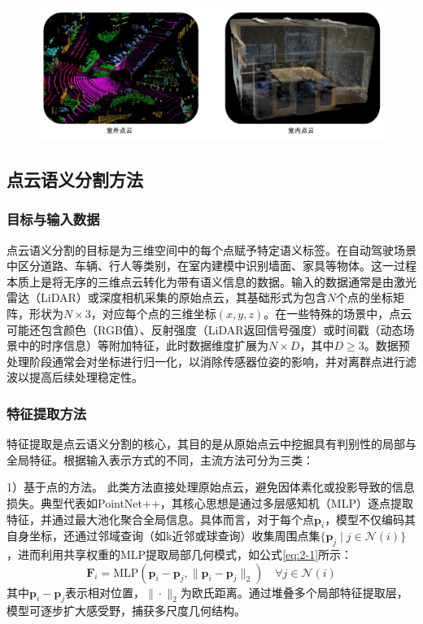 \vspace{-0.1cm}
\begin{figure}[h]
    \centering
    \includegraphics[width = \textwidth, scale=0.5]{ljx/figure/2-1PC.pdf}
    \label{fig:2-1}
\end{figure}
\vspace{-0.35cm}
\subsection{点云语义分割方法}
\subsubsection{目标与输入数据}
点云语义分割的目标是为三维空间中的每个点赋予特定语义标签。在自动驾驶场景中区分道路、车辆、行人等类别，在室内建模中识别墙面、家具等物体。这一过程本质上是将无序的三维点云转化为带有语义信息的数据。输入的数据通常是由激光雷达（LiDAR）或深度相机采集的原始点云，其基础形式为包含$N$个点的坐标矩阵，形状为$N \times 3$，对应每个点的三维坐标$(x, y, z)$。在一些特殊的场景中，点云可能还包含颜色（RGB值）、反射强度（LiDAR返回信号强度）或时间戳（动态场景中的时序信息）等附加特征，此时数据维度扩展为$N \times D$，其中$D \geq 3$。数据预处理阶段通常会对坐标进行归一化，以消除传感器位姿的影响，并对离群点进行滤波以提高后续处理稳定性。

\subsubsection{特征提取方法}
特征提取是点云语义分割的核心，其目的是从原始点云中挖掘具有判别性的局部与全局特征。根据输入表示方式的不同，主流方法可分为三类：

1）基于点的方法。
此类方法直接处理原始点云，避免因体素化或投影导致的信息损失。典型代表如PointNet++，其核心思想是通过多层感知机（MLP）逐点提取特征，并通过最大池化聚合全局信息。具体而言，对于每个点$\mathbf{p}_i$，模型不仅编码其自身坐标，还通过邻域查询（如k近邻或球查询）收集周围点集$\{\mathbf{p}_j \mid j \in \mathcal{N}(i)\}$，进而利用共享权重的MLP提取局部几何模式，如公式\eqref{eq:2-1}所示：
\begin{equation}
    \label{eq:2-1}
    \mathbf{F}_i = \text{MLP}\left(\mathbf{p}_i - \mathbf{p}_j, \|\mathbf{p}_i - \mathbf{p}_j\|_2\right) \quad \forall j \in \mathcal{N}(i)
\end{equation}
其中$\mathbf{p}_i - \mathbf{p}_j$表示相对位置，$\|\cdot\|_2$为欧氏距离。通过堆叠多个局部特征提取层，模型可逐步扩大感受野，捕获多尺度几何结构。

